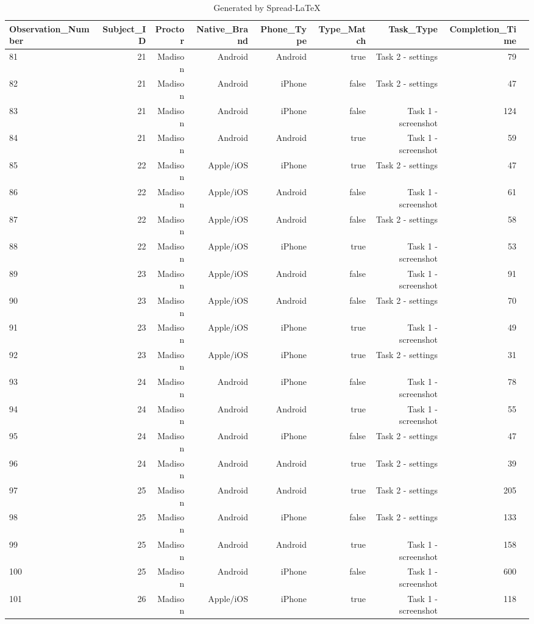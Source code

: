 \documentclass[conference]{IEEEtran}
\begin{document}
\begin{table}[!htp]\centering
\caption{Generated by Spread-LaTeX}\label{tab: }
\scriptsize
\begin{tabular}{lrrrrrrrr}\toprule
Observation\_Number &Subject\_ID &Proctor &Native\_Brand &Phone\_Type &Type\_Match &Task\_Type &Completion\_Time \\\midrule
81 &21 &Madison &Android &Android &true &Task 2 - settings &79 \\
82 &21 &Madison &Android &iPhone &false &Task 2 - settings &47 \\
83 &21 &Madison &Android &iPhone &false &Task 1 - screenshot &124 \\
84 &21 &Madison &Android &Android &true &Task 1 - screenshot &59 \\
85 &22 &Madison &Apple/iOS &iPhone &true &Task 2 - settings &47 \\
86 &22 &Madison &Apple/iOS &Android &false &Task 1 - screenshot &61 \\
87 &22 &Madison &Apple/iOS &Android &false &Task 2 - settings &58 \\
88 &22 &Madison &Apple/iOS &iPhone &true &Task 1 - screenshot &53 \\
89 &23 &Madison &Apple/iOS &Android &false &Task 1 - screenshot &91 \\
90 &23 &Madison &Apple/iOS &Android &false &Task 2 - settings &70 \\
91 &23 &Madison &Apple/iOS &iPhone &true &Task 1 - screenshot &49 \\
92 &23 &Madison &Apple/iOS &iPhone &true &Task 2 - settings &31 \\
93 &24 &Madison &Android &iPhone &false &Task 1 - screenshot &78 \\
94 &24 &Madison &Android &Android &true &Task 1 - screenshot &55 \\
95 &24 &Madison &Android &iPhone &false &Task 2 - settings &47 \\
96 &24 &Madison &Android &Android &true &Task 2 - settings &39 \\
97 &25 &Madison &Android &Android &true &Task 2 - settings &205 \\
98 &25 &Madison &Android &iPhone &false &Task 2 - settings &133 \\
99 &25 &Madison &Android &Android &true &Task 1 - screenshot &158 \\
100 &25 &Madison &Android &iPhone &false &Task 1 - screenshot &600 \\
101 &26 &Madison &Apple/iOS &iPhone &true &Task 1 - screenshot &118 \\

\end{tabular}
\end{table}
\end{document}
